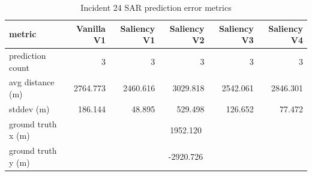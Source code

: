 \begin{table}[ht]
\centering
\caption{Incident 24 SAR prediction error metrics}
\label{tab:sar-incident-24}
\begin{tabular}{lrrrrr}
\hline
metric & Vanilla V1 & Saliency V1 & Saliency V2 & Saliency V3 & Saliency V4 \\
\hline
prediction count & 3 & 3 & 3 & 3 & 3 \\
avg distance (m) & 2764.773 & 2460.616 & 3029.818 & 2542.061 & 2846.301 \\
stddev (m) & 186.144 & 48.895 & 529.498 & 126.652 & 77.472 \\
ground truth x (m) & \multicolumn{5}{c}{1952.120} \\
ground truth y (m) & \multicolumn{5}{c}{-2920.726} \\
\hline
\end{tabular}
\end{table}
